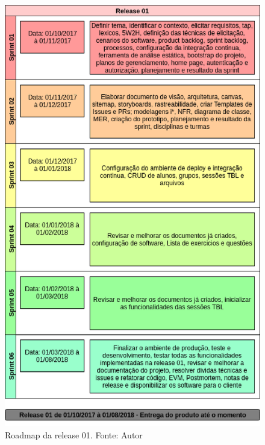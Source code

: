 \begin{apendicesenv}
\begin{figure}[h!]
	\centering
  \includegraphics[keepaspectratio=true,scale=0.8]{figuras/roadmap1.eps}
  \caption[Roadmap da release 01.]{Roadmap da release 01. Fonte: Autor}
	\label{fig:roadmap1}
\end{figure}


\end{apendicesenv}
